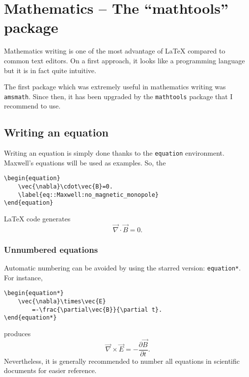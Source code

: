 

\chapter{Mathematics -- The \enquote{mathtools} package}

Mathematics writing is one of the most advantage of \LaTeX{} compared to common text editors.
On a first approach, it looks like a programming language but it is in fact quite intuitive.

The first package which was extremely useful in mathematics writing was \texttt{amsmath}.
Since then, it has been upgraded by the \texttt{mathtools} package that I recommend to use.


\section{Writing an equation}

	Writing an equation is simply done thanks to the \texttt{equation} environment.
	Maxwell's equations will be used as examples.
	So, the 
\begin{lstlisting}[language={[LaTeX]TeX}]
\begin{equation}
	\vec{\nabla}\cdot\vec{B}=0.
	\label{eq::Maxwell:no_magnetic_monopole}
\end{equation}
\end{lstlisting}
	\LaTeX{} code generates
	\begin{equation}
		\vec{\nabla}\cdot\vec{B}=0.
		\label{eq::Maxwell:no_magnetic_monopole}
	\end{equation}
	
	
	\subsection{Unnumbered equations}
	
		Automatic numbering can be avoided by using the starred version: \texttt{equation*}.
		For instance,
\begin{lstlisting}[language={[LaTeX]TeX}]
\begin{equation*}
	\vec{\nabla}\times\vec{E}
		=-\frac{\partial\vec{B}}{\partial t}.
\end{equation*}
\end{lstlisting}	
produces
		\begin{equation*}
			\vec{\nabla}\times\vec{E}
				=-\frac{\partial\vec{B}}{\partial t}.
		\end{equation*}
		Nevertheless, it is generally recommended to number all equations in scientific documents for easier reference.
		
